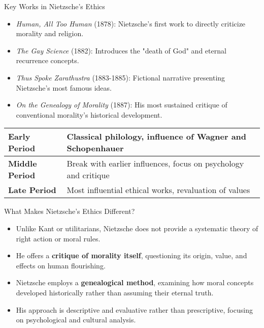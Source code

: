 \documentclass{beamer}
\begin{document}
\begin{frame}{Key Works in Nietzsche's Ethics}
\begin{itemize}
\item \textit{Human, All Too Human} (1878): Nietzsche's first work to directly criticize morality and religion.
\item \textit{The Gay Science} (1882): Introduces the "death of God" and eternal recurrence concepts.
\item \textit{Thus Spoke Zarathustra} (1883-1885): Fictional narrative presenting Nietzsche's most famous ideas.
\item \textit{On the Genealogy of Morality} (1887): His most sustained critique of conventional morality's historical development.
\end{itemize}

\begin{table}
\scriptsize
\begin{tabular}{ll}
\toprule
\textbf{Early Period} & Classical philology, influence of Wagner and Schopenhauer \\
\midrule
\textbf{Middle Period} & Break with earlier influences, focus on psychology and critique \\
\midrule
\textbf{Late Period} & Most influential ethical works, revaluation of values \\
\bottomrule
\end{tabular}
\end{table}
\end{frame}

\begin{frame}{What Makes Nietzsche's Ethics Different?}
\begin{itemize}
\item Unlike Kant or utilitarians, Nietzsche does not provide a systematic theory of right action or moral rules.
\item He offers a \textbf{critique of morality itself}, questioning its origin, value, and effects on human flourishing.
\item Nietzsche employs a \textbf{genealogical method}, examining how moral concepts developed historically rather than assuming their eternal truth.
\item His approach is descriptive and evaluative rather than prescriptive, focusing on psychological and cultural analysis.
\end{itemize}

\begin{center}
\end{center}
\end{frame}
\end{document}
